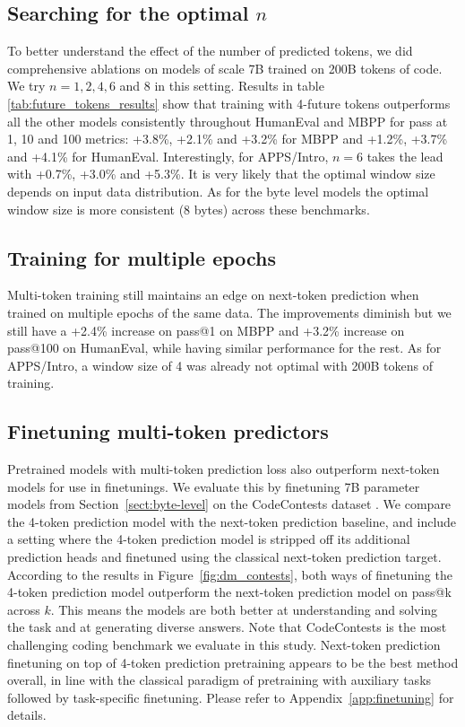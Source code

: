 \subsection{Searching for the optimal $n$}
\label{sect:optimal-future}

To better understand the effect of the number of predicted tokens, we did comprehensive ablations on models of scale 7B trained on 200B tokens of code. We try $n=1,2,4,6$ and $8$ in this setting. Results in table \ref{tab:future_tokens_results} show that training with 4-future tokens outperforms all the other models consistently throughout HumanEval and MBPP for pass at 1, 10 and 100 metrics: +3.8\%, +2.1\% and +3.2\% for MBPP and +1.2\%, +3.7\% and +4.1\% for HumanEval. Interestingly, for APPS/Intro, $n=6$ takes the lead with +0.7\%, +3.0\% and +5.3\%. It is very likely that the optimal window size depends on input data distribution. As for the byte level models the optimal window size is more consistent (8 bytes) across these benchmarks. 












\subsection{Training for multiple epochs}
\label{sect:multi-epoch}
Multi-token training still maintains an edge on next-token prediction when trained on multiple epochs of the same data. The improvements diminish but we still have a +2.4\% increase on pass@1 on MBPP and +3.2\% increase on pass@100 on HumanEval, while having similar performance for the rest. As for APPS/Intro, a window size of 4 was already not optimal with 200B tokens of training. 


\subsection{Finetuning multi-token predictors}
\label{sect:finetuning}
Pretrained models with multi-token prediction loss also outperform next-token models for use in finetunings. We evaluate this by finetuning 7B parameter models from Section~\ref{sect:byte-level} on the CodeContests dataset \citep{li2022competition}. We compare the 4-token prediction model with the next-token prediction baseline, and include a setting where the 4-token prediction model is stripped off its additional prediction heads and finetuned using the classical next-token prediction target. According to the results in Figure~\ref{fig:dm_contests}, both ways of finetuning the 4-token prediction model outperform the next-token prediction model on pass@k across $k$. This means the models are both better at understanding and solving the task and at generating diverse answers. Note that CodeContests is the most challenging coding benchmark we evaluate in this study. Next-token prediction finetuning on top of 4-token prediction pretraining appears to be the best method overall, in line with the classical paradigm of pretraining with auxiliary tasks followed by task-specific finetuning. Please refer to Appendix~\ref{app:finetuning} for details.


